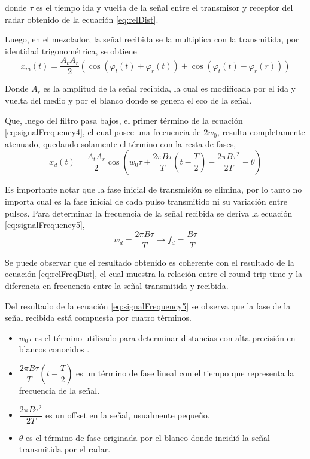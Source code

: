 donde $\tau$ es el tiempo ida y vuelta de la señal entre el transmisor y receptor del radar obtenido de la ecuación \ref{eq:relDist}.

Luego, en el mezclador, la señal recibida se la multiplica con la transmitida, por identidad trigonométrica, se obtiene
\begin{equation}
  x_m(t) = \dfrac{A_tA_r}{2}(\cos(\varphi_t(t)+\varphi_r(t)) + \cos(\varphi_t(t)- \varphi_r(r)))
  \label{eq:signalFrequency4}
\end{equation}

Donde $A_r$ es la amplitud de la señal recibida, la cual es modificada por el ida y vuelta del medio y por el blanco donde se genera el eco de la señal.

Que, luego del filtro pasa bajos, el primer término de la ecuación \ref{eq:signalFrequency4}, el cual posee una frecuencia de $2w_0$, resulta completamente atenuado, quedando solamente el término con la resta de fases,
\begin{equation}
  x_d(t) = \dfrac{A_tA_r}{2}\cos(w_0\tau + \dfrac{2\pi B\tau}{T}(t - \dfrac{T}{2}) - \dfrac{2\pi B\tau^2}{2T} - \theta)
  \label{eq:signalFrequency5}
\end{equation}

Es importante notar que la fase inicial de transmisión se elimina, por lo tanto no importa cual es la fase inicial de cada pulso
transmitido ni su variación entre pulsos. Para determinar la frecuencia de la señal recibida se deriva la ecuación \ref{eq:signalFrequency5}, 
\begin{equation}\label{eq:beatFreq}
  w_d = \dfrac{2\pi B\tau}{T} \rightarrow f_d = \dfrac{B\tau}{T}
\end{equation}

Se puede observar que el resultado obtenido es coherente con el resultado de la ecuación \ref{eq:relFreqDist}, el cual muestra la relación entre el round-trip time y la diferencia en frecuencia entre la señal transmitida y recibida.

Del resultado de la ecuación \ref{eq:signalFrequency5} se observa que la fase de la señal recibida está compuesta por cuatro términos.
\begin{itemize}
  \item $w_0\tau$ es el término utilizado para determinar distancias con alta precisión en blancos conocidos \cite{Brennan2014a}.
  \item $\dfrac{2\pi B\tau}{T}(t - \dfrac{T}{2})$ es un término de fase lineal con el tiempo que representa la frecuencia de la señal.
  \item $\dfrac{2\pi B\tau^2}{2T}$ es un offset en la señal, usualmente pequeño.
  \item $\theta$ es el término de fase originada por el blanco donde incidió la señal transmitida por el radar.
\end{itemize}

